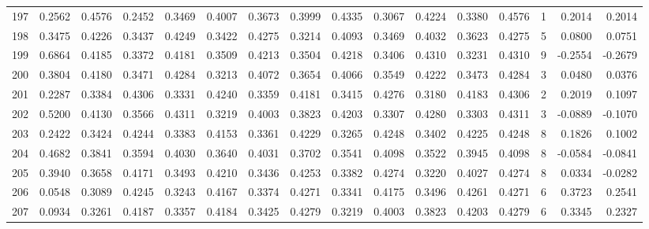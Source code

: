 \begin{tabular}{lrrrrrrrrrrrrrrr}
197 &      0.2562 &  0.4576 &  0.2452 &  0.3469 &  0.4007 &  0.3673 &  0.3999 &  0.4335 &  0.3067 &  0.4224 &   0.3380 &     0.4576 &      1 &                    0.2014 &                     0.2014 \\
198 &      0.3475 &  0.4226 &  0.3437 &  0.4249 &  0.3422 &  0.4275 &  0.3214 &  0.4093 &  0.3469 &  0.4032 &   0.3623 &     0.4275 &      5 &                    0.0800 &                     0.0751 \\
199 &      0.6864 &  0.4185 &  0.3372 &  0.4181 &  0.3509 &  0.4213 &  0.3504 &  0.4218 &  0.3406 &  0.4310 &   0.3231 &     0.4310 &      9 &                   -0.2554 &                    -0.2679 \\
200 &      0.3804 &  0.4180 &  0.3471 &  0.4284 &  0.3213 &  0.4072 &  0.3654 &  0.4066 &  0.3549 &  0.4222 &   0.3473 &     0.4284 &      3 &                    0.0480 &                     0.0376 \\
201 &      0.2287 &  0.3384 &  0.4306 &  0.3331 &  0.4240 &  0.3359 &  0.4181 &  0.3415 &  0.4276 &  0.3180 &   0.4183 &     0.4306 &      2 &                    0.2019 &                     0.1097 \\
202 &      0.5200 &  0.4130 &  0.3566 &  0.4311 &  0.3219 &  0.4003 &  0.3823 &  0.4203 &  0.3307 &  0.4280 &   0.3303 &     0.4311 &      3 &                   -0.0889 &                    -0.1070 \\
203 &      0.2422 &  0.3424 &  0.4244 &  0.3383 &  0.4153 &  0.3361 &  0.4229 &  0.3265 &  0.4248 &  0.3402 &   0.4225 &     0.4248 &      8 &                    0.1826 &                     0.1002 \\
204 &      0.4682 &  0.3841 &  0.3594 &  0.4030 &  0.3640 &  0.4031 &  0.3702 &  0.3541 &  0.4098 &  0.3522 &   0.3945 &     0.4098 &      8 &                   -0.0584 &                    -0.0841 \\
205 &      0.3940 &  0.3658 &  0.4171 &  0.3493 &  0.4210 &  0.3436 &  0.4253 &  0.3382 &  0.4274 &  0.3220 &   0.4027 &     0.4274 &      8 &                    0.0334 &                    -0.0282 \\
206 &      0.0548 &  0.3089 &  0.4245 &  0.3243 &  0.4167 &  0.3374 &  0.4271 &  0.3341 &  0.4175 &  0.3496 &   0.4261 &     0.4271 &      6 &                    0.3723 &                     0.2541 \\
207 &      0.0934 &  0.3261 &  0.4187 &  0.3357 &  0.4184 &  0.3425 &  0.4279 &  0.3219 &  0.4003 &  0.3823 &   0.4203 &     0.4279 &      6 &                    0.3345 &                     0.2327 \\

\end{tabular}
